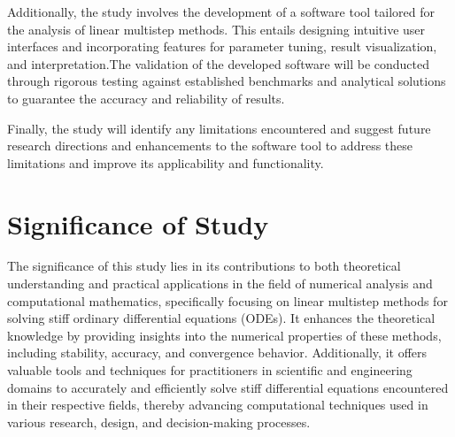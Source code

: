\documentclass[a4paper, twoside]{report} %
\begin{document}
	Additionally, the study involves the development of a software tool tailored for the analysis of linear multistep methods. This entails designing intuitive user interfaces and incorporating features for parameter tuning, result visualization, and interpretation.The validation of the developed software will be conducted through rigorous testing against established benchmarks and analytical solutions to guarantee the accuracy and reliability of results.

	Finally, the study will identify any limitations encountered and suggest future research directions and enhancements to the software tool to address these limitations and improve its applicability and functionality.

	\section{Significance of Study}
	The significance of this study lies in its contributions to both theoretical understanding and practical applications in the field of numerical analysis and computational mathematics, specifically focusing on linear multistep methods for solving stiff ordinary differential equations (ODEs). It enhances the theoretical knowledge by providing insights into the numerical properties of these methods, including stability, accuracy, and convergence behavior. Additionally, it offers valuable tools and techniques for practitioners in scientific and engineering domains to accurately and efficiently solve stiff differential equations encountered in their respective fields, thereby advancing computational techniques used in various research, design, and decision-making processes.
\end{document}
